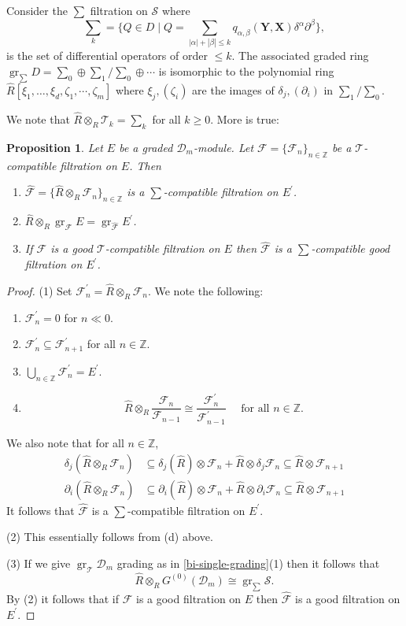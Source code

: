 \documentclass{amsart}
\newcommand{\ZZ}{\mathbb{Z} }
\newcommand{\D}{\mathcal{D} }
\newcommand{\T}{\mathcal{T} }
\newcommand{\F}{\mathcal{F} }
\newcommand{\bX}{\mathbf{X} }
\newcommand{\bY}{\mathbf{Y} }
\newcommand{\Sc}{\mathcal{S} }
\newcommand{\gr}{\operatorname{gr}}
\theoremstyle{plain}
\newtheorem{proposition}[theorem]{Proposition}
\theoremstyle{definition}
\theoremstyle{remark}
\begin{document}
 \s  Consider the $\sum$ filtration  on $\Sc$
where
$$\sum_k = \{ Q \in D \mid Q = \sum_{|\alpha| + |\beta| \leq k} q_{\alpha, \beta}(\bY,\bX)\delta^\alpha\partial^\beta \}, $$ 
is the set of differential operators of order $\leq k$. 
The associated graded ring $\gr_{\sum} D = \sum_0 \oplus \sum_1/\sum_0 \oplus \cdots $ is isomorphic to the polynomial ring $\widehat{R}[\xi_1,\ldots, \xi_d, \zeta_1,\cdots, \zeta_m]$ where $\xi_j, (\zeta_i)$ are the images of $\delta_j, 
(\partial_i)$ in $\sum_1/\sum_0$. 

We note that $\widehat{R}\otimes_R \T_k = \sum_k$ for all $k \geq 0$. More is true:
\begin{proposition}\label{filt-flat}
Let $E$ be a graded $\D_m$-module. Let $\F = \{ \F_n \}_{n \in \ZZ}$ be a $\T$-compatible filtration on $E$. Then
\begin{enumerate}[\rm (1)]
\item
 $\widehat{\F} = \{ \widehat{R}\otimes_R\F_n \}_{n \in \ZZ}$ is a $\sum$-compatible filtration on $E^\prime$.
 \item
$ \widehat{R} \otimes_R \gr_\F E = \gr_{\widehat{\F}} E^\prime$.
\item
If $\F$ is a good $\T$-compatible filtration on $E$ then  $\widehat{\F}$ is a $\sum$-compatible good filtration on $E^\prime$.
\end{enumerate}
\end{proposition}
\begin{proof}
(1) Set $\F_n^\prime = \widehat{R}\otimes_R \F_n$. We note the following:
\begin{enumerate}[\rm (a)]
\item
$\F_n^\prime = 0$ for $n \ll 0$.
\item
$\F_n^\prime \subseteq \F_{n+1}^\prime$ for all $n \in \ZZ$.
\item
$\bigcup_{n \in \ZZ} \F_n^\prime = E^\prime$.
\item
$$\widehat{R} \otimes_R \frac{\F_n}{\F_{n-1}} \cong  \frac{\F_n^\prime}{\F_{n-1}^\prime}  \quad \text{ for all $n \in \ZZ$.} $$
\end{enumerate}
We also note that  for all $n \in \ZZ$,
\begin{align*}
\delta_j(\widehat{R} \otimes_R \F_n) &\subseteq \delta_j(\widehat{R})\otimes \F_n + \widehat{R}\otimes \delta_j \F_n \subseteq \widehat{R} \otimes \F_{n+1} \\
\partial_i(\widehat{R} \otimes_R \F_n) &\subseteq \partial_i(\widehat{R})\otimes \F_n + \widehat{R}\otimes \partial_i \F_n \subseteq \widehat{R} \otimes \F_{n+1}
\end{align*}
It follows that  $\widehat{\F} $ is a $\sum$-compatible filtration on $E^\prime$.

(2) This essentially follows from (d) above.

(3) If we give $\gr_\T \D_m$ grading as in \ref{bi-single-grading}(1) then it follows that 
$$\widehat{R}\otimes_R G^{(0)}(\D_m) \cong \gr_{\sum} \Sc. $$
By (2) it follows that if $\F$ is a good filtration on $E$ then $\widehat{\F}$ is a good filtration on $E^\prime$.
\end{proof}
\end{document}
